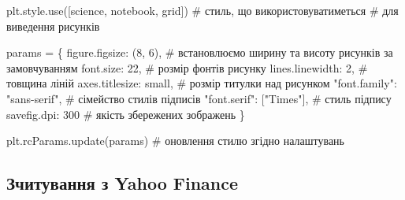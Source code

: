 \documentclass[
  letterpaper,
]{report}
\newenvironment{Shaded}{\begin{snugshade}}{\end{snugshade}}
\newcommand{\CommentTok}[1]{\textcolor[rgb]{0.37,0.37,0.37}{#1}}
\newcommand{\DecValTok}[1]{\textcolor[rgb]{0.68,0.00,0.00}{#1}}
\newcommand{\NormalTok}[1]{\textcolor[rgb]{0.00,0.23,0.31}{#1}}
\newcommand{\OperatorTok}[1]{\textcolor[rgb]{0.37,0.37,0.37}{#1}}
\newcommand{\StringTok}[1]{\textcolor[rgb]{0.13,0.47,0.30}{#1}}
\begin{document}
\begin{Shaded}
\begin{Highlighting}[]
\NormalTok{plt.style.use([}\StringTok{\textquotesingle{}science\textquotesingle{}}\NormalTok{, }\StringTok{\textquotesingle{}notebook\textquotesingle{}}\NormalTok{, }\StringTok{\textquotesingle{}grid\textquotesingle{}}\NormalTok{]) }\CommentTok{\# стиль, що використовуватиметься}
                                               \CommentTok{\# для виведення рисунків}

\NormalTok{params }\OperatorTok{=}\NormalTok{ \{}
    \StringTok{\textquotesingle{}figure.figsize\textquotesingle{}}\NormalTok{: (}\DecValTok{8}\NormalTok{, }\DecValTok{6}\NormalTok{),         }\CommentTok{\# встановлюємо ширину та висоту рисунків за замовчуванням}
    \StringTok{\textquotesingle{}font.size\textquotesingle{}}\NormalTok{: }\DecValTok{22}\NormalTok{,                  }\CommentTok{\# розмір фонтів рисунку}
    \StringTok{\textquotesingle{}lines.linewidth\textquotesingle{}}\NormalTok{: }\DecValTok{2}\NormalTok{,             }\CommentTok{\# товщина ліній}
    \StringTok{\textquotesingle{}axes.titlesize\textquotesingle{}}\NormalTok{: }\StringTok{\textquotesingle{}small\textquotesingle{}}\NormalTok{,        }\CommentTok{\# розмір титулки над рисунком}
    \StringTok{"font.family"}\NormalTok{: }\StringTok{"sans{-}serif"}\NormalTok{,      }\CommentTok{\# сімейство стилів підписів }
    \StringTok{"font.serif"}\NormalTok{: [}\StringTok{"Times"}\NormalTok{],          }\CommentTok{\# стиль підпису}
    \StringTok{\textquotesingle{}savefig.dpi\textquotesingle{}}\NormalTok{: }\DecValTok{300}                \CommentTok{\# якість збережених зображень}
\NormalTok{\}}

\NormalTok{plt.rcParams.update(params)           }\CommentTok{\# оновлення стилю згідно налаштувань}
\end{Highlighting}
\end{Shaded}

\hypertarget{ux437ux447ux438ux442ux443ux432ux430ux43dux43dux44f-ux437-yahoo-finance}{%
\subsection{Зчитування з Yahoo
Finance}\label{ux437ux447ux438ux442ux443ux432ux430ux43dux43dux44f-ux437-yahoo-finance}}
\end{document}
